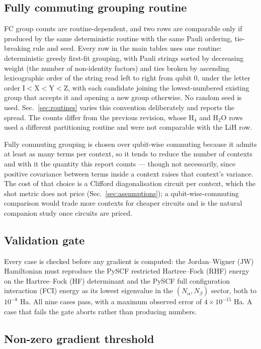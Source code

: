 \documentclass[10pt]{article}
\begin{document}
\subsection{Fully commuting grouping routine}

FC group counts are routine-dependent, and two rows are comparable only if produced by the same deterministic routine with the same Pauli ordering, tie-breaking rule and seed. Every row in the main tables uses one routine: deterministic greedy first-fit grouping, with Pauli strings sorted by decreasing weight (the number of non-identity factors) and ties broken by ascending lexicographic order of the string read left to right from qubit $0$, under the letter order $\mathrm{I}<\mathrm{X}<\mathrm{Y}<\mathrm{Z}$, with each candidate joining the lowest-numbered existing group that accepts it and opening a new group otherwise. No random seed is used. Sec.~\ref{sec:routines} varies this convention deliberately and reports the spread. The counts differ from the previous revision, whose H$_4$ and H$_2$O rows used a different partitioning routine and were not comparable with the LiH row.

Fully commuting grouping is chosen over qubit-wise commuting because it admits at least as many terms per context, so it tends to reduce the number of contexts and with it the quantity this report counts --- though not necessarily, since positive covariance between terms inside a context raises that context's variance. The cost of that choice is a Clifford diagonalisation circuit per context, which the shot metric does not price (Sec.~\ref{sec:assumptions}); a qubit-wise-commuting comparison would trade more contexts for cheaper circuits and is the natural companion study once circuits are priced.

\subsection{Validation gate}

Every case is checked before any gradient is computed: the Jordan--Wigner (JW) Hamiltonian must reproduce the PySCF restricted Hartree--Fock (RHF) energy on the Hartree--Fock (HF) determinant and the PySCF full configuration interaction (FCI) energy as its lowest eigenvalue in the $(N_\alpha,N_\beta)$ sector, both to $10^{-8}$ Ha. All nine cases pass, with a maximum observed error of $4\times10^{-15}$ Ha. A case that fails the gate aborts rather than producing numbers.

\subsection{Non-zero gradient threshold}
\end{document}
